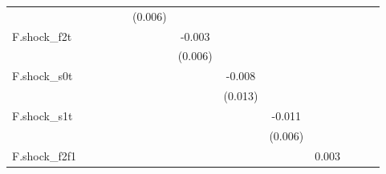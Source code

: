 {\begin{tabular}{l*{12}{c}}
            &                     &                     &                     &                     &     (0.006)         &                     &                     &                     &                     &                     &                     &                     \\
\addlinespace
F.shock\_f2t &                     &                     &                     &                     &                     &      -0.003         &                     &                     &                     &                     &                     &                     \\
            &                     &                     &                     &                     &                     &     (0.006)         &                     &                     &                     &                     &                     &                     \\
\addlinespace
F.shock\_s0t &                     &                     &                     &                     &                     &                     &      -0.008         &                     &                     &                     &                     &                     \\
            &                     &                     &                     &                     &                     &                     &     (0.013)         &                     &                     &                     &                     &                     \\
\addlinespace
F.shock\_s1t &                     &                     &                     &                     &                     &                     &                     &      -0.011\sym{*}  &                     &                     &                     &                     \\
            &                     &                     &                     &                     &                     &                     &                     &     (0.006)         &                     &                     &                     &                     \\
\addlinespace
F.shock\_f2f1&                     &                     &                     &                     &                     &                     &                     &                     &       0.003         &                     &                     &                     \\

\end{tabular}}
